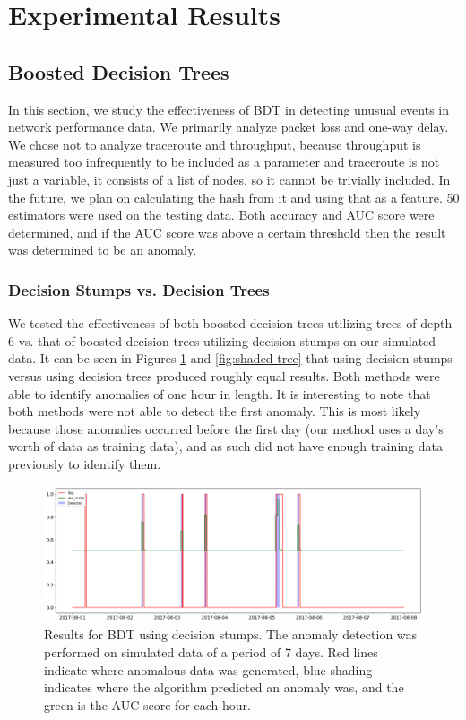 \documentclass[5p]{elsarticle}
\begin{document}
\section{Experimental Results}

\subsection{Boosted Decision Trees}

In this section, we study the effectiveness of BDT in detecting unusual events in network performance data. We primarily analyze packet loss and one-way delay. We chose not to analyze traceroute and throughput, because throughput is measured too infrequently to be included as a parameter and traceroute is not just a variable, it consists of a list of nodes, so it cannot be trivially included. In the future, we plan on calculating the hash from it and using that as a feature. 50 estimators were used on the testing data. Both accuracy and AUC score were determined, and if the AUC score was above a certain threshold then the result was determined to be an anomaly.

\subsubsection{Decision Stumps vs. Decision Trees}

We tested the effectiveness of both boosted decision trees utilizing trees of depth 6 vs. that of boosted decision trees utilizing decision stumps on our simulated data. It can be seen in Figures \ref{fig:shaded} and \ref{fig:shaded-tree} that using decision stumps versus using decision trees produced roughly equal results. Both methods were able to identify anomalies of one hour in length. It is interesting to note that both methods were not able to detect the first anomaly. This is most likely because those anomalies occurred before the first day (our method uses a day’s worth of data as training data), and as such did not have enough training data previously to identify them. 

\begin{figure}[htbp]
    \centering
    \includegraphics[width=\linewidth]{shaded-stumps.png}
    \caption{Results for BDT using decision stumps. The anomaly detection was performed on simulated data of a period of 7 days. Red lines indicate where anomalous data was generated, blue shading indicates where the algorithm predicted an anomaly was, and the green is the AUC score for each hour.}
    \label{fig:shaded}
\end{figure}
\end{document}

